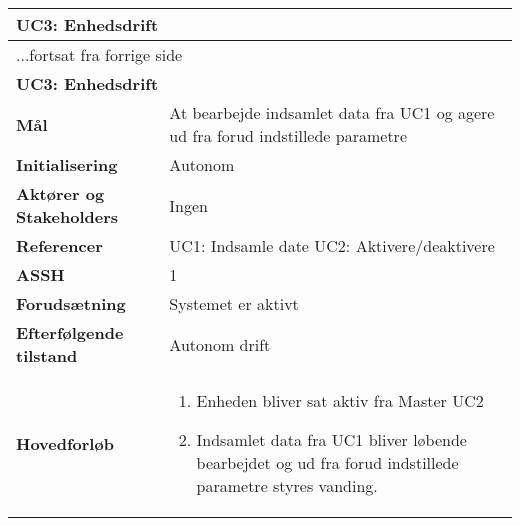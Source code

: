 \begin{center} \centering \label{UC10} 
	\begin{longtable}{|p{5cm}|p{9cm}|}  %
	\hline
		\multicolumn{2}{|l|}{\textbf{UC3: Enhedsdrift}} \\\hline
		\endfirsthead
		
		\multicolumn{2}{l}{...fortsat fra forrige side} \\ \hline %
		\multicolumn{2}{|l|}{\textbf{UC3: Enhedsdrift}} \\\hline 
		\endhead	
		
		\textbf{Mål}								&At bearbejde indsamlet data fra UC1 og agere ud fra forud indstillede parametre 			\\\hline
		\textbf{Initialisering}					&Autonom								\\\hline
		\textbf{Aktører og Stakeholders}			&Ingen								\\\hline
		\textbf{Referencer}						&UC1: Indsamle date 					\newline
												 UC2: Aktivere/deaktivere			\\\hline
		\textbf{ASSH}							&1									\\\hline
		\textbf{Forudsætning}					&Systemet er aktivt					\\\hline
		\textbf{Efterfølgende tilstand}			&Autonom drift						\\\hline
		\textbf{Hovedforløb}					
			&\begin{enumerate}
	
				\item Enheden bliver sat aktiv fra Master UC2
				
				\item Indsamlet data fra UC1 bliver løbende bearbejdet og ud fra forud indstillede parametre styres vanding.
			
			\end{enumerate}\\\hline
	\end{longtable}
\end{center}


